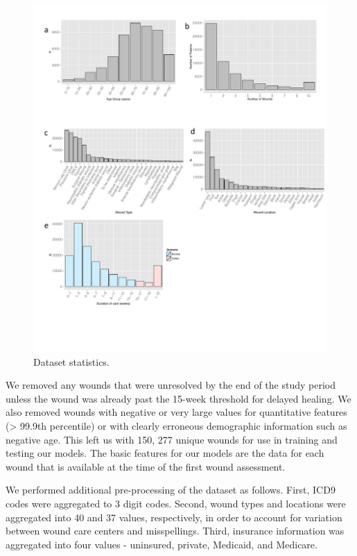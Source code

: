 \begin{figure}
  \begin{center}
    \includegraphics[width=0.9\linewidth]{ch5-figures/dataset_stats.pdf}
  \end{center}
  \caption[Wound healing dataset statistics]{Dataset statistics.}
  \label{fig:short}
\end{figure}

We removed any wounds that were unresolved by the end of the study
period unless the wound was already past the 15-week threshold for
delayed healing.  We also removed wounds with negative or very large
values for quantitative features (> 99.9th percentile) or with clearly
erroneous demographic information such as negative age.  This left us
with 150, 277 unique wounds for use in training and testing our
models.  The basic features for our models are the data for each wound
that is available at the time of the first wound assessment.

We performed additional pre-processing of the dataset as follows.
First, ICD9 codes were aggregated to 3 digit codes.  Second, wound
types and locations were aggregated into 40 and 37 values,
respectively, in order to account for variation between wound care
centers and misspellings.  Third, insurance information was aggregated
into four values - uninsured, private, Medicaid, and Medicare.

